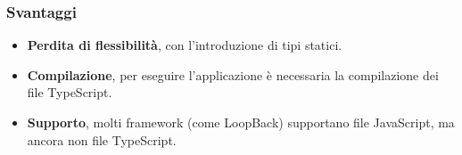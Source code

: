 \subsubsection{Svantaggi}
\begin{itemize}
\item \textbf{Perdita di flessibilit\`a}, con l'introduzione di tipi statici.
\item \textbf{Compilazione}, per eseguire l'applicazione \`e necessaria la compilazione dei file TypeScript.
\item \textbf{Supporto}, molti framework (come LoopBack) supportano file JavaScript, ma ancora non file TypeScript.
\end{itemize}
